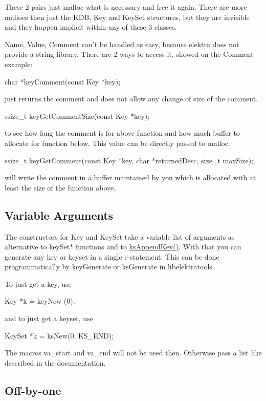 These 2 pairs just malloc what is necessary and free it again. There are more mallocs then just the K\+D\+B, Key and Key\+Set structures, but they are invisible and they happen implicit within any of these 3 classes.

Name, Value, Comment can't be handled as easy, because elektra does not provide a string library. There are 2 ways to access it, showed on the Comment example\+: \begin{DoxyVerb}    char *keyComment(const Key *key);
\end{DoxyVerb}
 just returns the comment and does not allow any change of size of the comment. \begin{DoxyVerb}    ssize_t keyGetCommentSize(const Key *key);
\end{DoxyVerb}
 to see how long the comment is for above function and how much buffer to allocate for function below. This value can be directly passed to malloc. \begin{DoxyVerb}    ssize_t keyGetComment(const Key *key, char *returnedDesc, size_t maxSize);
\end{DoxyVerb}
 will write the comment in a buffer maintained by you which is allocated with at least the size of the function above.

\subsection*{Variable Arguments}

The constructors for Key and Key\+Set take a variable list of arguments as alternative to key\+Set$\ast$ functions and to \hyperlink{group__keyset_gaa5a1d467a4d71041edce68ea7748ce45}{ks\+Append\+Key()}. With that you can generate any key or keyset in a single c-\/statement. This can be done programmatically by key\+Generate or ks\+Generate in libelektratools.

To just get a key, use \begin{DoxyVerb}    Key *k = keyNew (0);  
\end{DoxyVerb}
 and to just get a keyset, use \begin{DoxyVerb}    KeySet *k = ksNew(0, KS_END);
\end{DoxyVerb}


The macros va\+\_\+start and va\+\_\+end will not be used then. Otherwise pass a list like described in the documentation.

\subsection*{Off-\/by-\/one}

